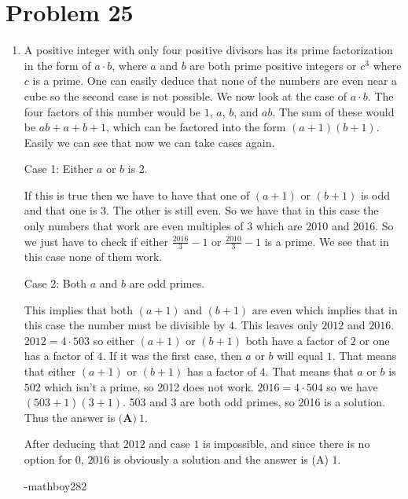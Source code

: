 \documentclass{article}%
\begin{document}
%
\section*{Problem 25}%
\label{sec:Problem25}%
\begin{enumerate}%
\item%
A positive integer with only four positive divisors has its prime factorization in the form of $a \cdot b$, where $a$ and $b$ are both prime positive integers or $c^3$ where $c$ is a prime. One can easily deduce that none of the numbers are even near a cube so the second case is not possible. We now look at the case of $a \cdot b$. The four factors of this number would be $1$, $a$, $b$, and $ab$.  The sum of these would be $ab+a+b+1$, which can be factored into the form $(a+1)(b+1)$. Easily we can see that now we can take cases again. 

Case 1: Either $a$ or $b$ is 2. 

If this is true then we have to have that one of $(a+1)$ or $(b+1)$ is odd and that one is 3. The other is still even.  So we have that in this case the only numbers that work are even multiples of 3 which are 2010 and 2016. So we just have to check if either $\frac{2016}{3} - 1$  or $\frac{2010}{3} - 1$ is a prime. We see that in this case none of them work.

Case 2: Both $a$ and $b$ are odd primes. 

This implies that both $(a+1)$ and $(b+1)$ are even which implies that in this case the number must be divisible by $4$. This leaves only $2012$ and $2016$.
$2012={4}\cdot{503}$ so either $(a+1)$ or $(b+1)$ both have a factor of $2$ or one has a factor of $4$. If it was the first case, then $a$ or $b$ will equal $1$.  That means that either $(a+1)$ or $(b+1)$ has a factor of $4$.  That means that $a$ or $b$ is $502$ which isn't a prime, so 2012 does not work.  $2016 = 4 \cdot 504$ so we have $(503 + 1)(3 + 1)$. 503 and 3 are both odd primes, so 2016 is a solution. Thus the answer is $\boxed{\textbf{(A)}\ 1}$.

After deducing that $2012$ and case $1$ is impossible, and since there is no option for $0$, $2016$ is obviously a solution and the answer is (A) $1$.

-mathboy282

%
\end{enumerate}

%
\end{document}
